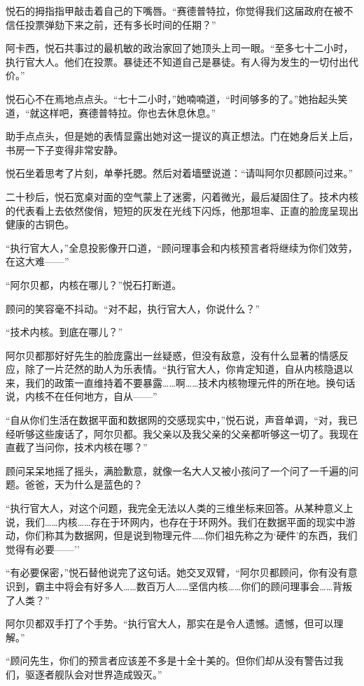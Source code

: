 \documentclass[AutoFakeBold=true]{book}
\begin{document}
悦石的拇指指甲敲击着自己的下嘴唇。``赛德普特拉，你觉得我们这届政府在被不信任投票弹劾下来之前，还有多长时间的任期？''

阿卡西，悦石共事过的最机敏的政治家回了她顶头上司一眼。``至多七十二小时，执行官大人。他们在投票。暴徒还不知道自己是暴徒。有人得为发生的一切付出代价。''

悦石心不在焉地点点头。``七十二小时，''她喃喃道，``时间够多的了。''她抬起头笑道，``就这样吧，赛德普特拉。你也去休息休息。''

助手点点头，但是她的表情显露出她对这一提议的真正想法。门在她身后关上后，书房一下子变得非常安静。

悦石坐着思考了片刻，单拳托腮。然后对着墙壁说道：``请叫阿尔贝都顾问过来。''

二十秒后，悦石宽桌对面的空气蒙上了迷雾，闪着微光，最后凝固住了。技术内核的代表看上去依然俊俏，短短的灰发在光线下闪烁，他那坦率、正直的脸庞呈现出健康的古铜色。

``执行官大人，''全息投影像开口道，``顾问理事会和内核预言者将继续为你们效劳，在这大难——''

``阿尔贝都，内核在哪儿？''悦石打断道。

顾问的笑容毫不抖动。``对不起，执行官大人，你说什么？''

``技术内核。到底在哪儿？''

阿尔贝都那好好先生的脸庞露出一丝疑惑，但没有敌意，没有什么显著的情感反应，除了一片茫然的助人为乐表情。``执行官大人，你肯定知道，自从内核隐退以来，我们的政策一直维持着不要暴露……啊……技术内核物理元件的所在地。换句话说，内核不在任何地方，自从——''

``自从你们生活在数据平面和数据网的交感现实中，''悦石说，声音单调，``对，我已经听够这些废话了，阿尔贝都。我父亲以及我父亲的父亲都听够这一切了。我现在直截了当问你，技术内核在哪？''

顾问呆呆地摇了摇头，满脸歉意，就像一名大人又被小孩问了一个问了一千遍的问题。爸爸，天为什么是蓝色的？

``执行官大人，对这个问题，我完全无法以人类的三维坐标来回答。从某种意义上说，我们……内核……存在于环网内，也存在于环网外。我们在数据平面的现实中游动，你们称其为数据网，但是说到物理元件……你们祖先称之为`硬件'的东西，我们觉得有必要——''

``有必要保密，''悦石替他说完了这句话。她交叉双臂，``阿尔贝都顾问，你有没有意识到，霸主中将会有好多人……数百万人……坚信内核……你们的顾问理事会……背叛了人类？''

阿尔贝都双手打了个手势。``执行官大人，那实在是令人遗憾。遗憾，但可以理解。''

``顾问先生，你们的预言者应该差不多是十全十美的。但你们却从没有警告过我们，驱逐者舰队会对世界造成毁灭。''
\end{document}

